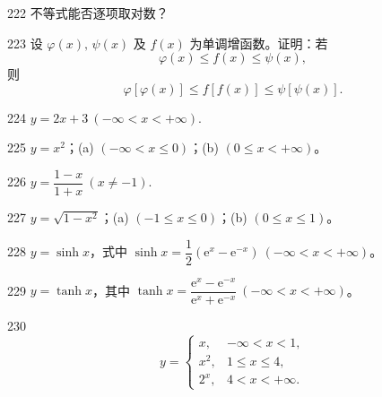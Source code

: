 \begin{prob}[S]{222}
不等式能否逐项取对数？
\end{prob}

\begin{prob}[M]{223}
设 $\varphi(x),\, \psi(x)$ 及 $f(x)$ 为单调增函数。证明：若
\[
\varphi(x) \leqslant f(x) \leqslant \psi(x),
\]
则
\[
\varphi[\varphi(x)] \leqslant f[f(x)] \leqslant \psi[\psi(x)].
\]
\end{prob}


\begin{prob}[S]{224}
$y = 2x + 3\ (-\infty < x < +\infty)$.
\end{prob}

\begin{prob}[M]{225}
$y = x^2$；(a) $(-\infty < x \leqslant 0)$；\qquad (b) $(0 \leqslant x < +\infty)$。
\end{prob}

\begin{prob}[S]{226}
$y = \dfrac{1 - x}{1 + x}\ (x \neq -1)$.
\end{prob}

\begin{prob}[M]{227}
$y = \sqrt{1 - x^2}$；(a) $(-1 \leqslant x \leqslant 0)$；\qquad (b) $(0 \leqslant x \leqslant 1)$。
\end{prob}

\begin{prob}[M]{228}
$y = \sinh x$，式中 $\sinh x = \dfrac{1}{2}(\mathrm{e}^x - \mathrm{e}^{-x})\ (-\infty < x < +\infty)$。
\end{prob}

\begin{prob}[M]{229}
$y = \tanh x$，其中 $\tanh x = \dfrac{\mathrm{e}^x - \mathrm{e}^{-x}}{\mathrm{e}^x + \mathrm{e}^{-x}}\ (-\infty < x < +\infty)$。
\end{prob}

\begin{prob}[M]{230}
\[
y = \begin{cases}
x, & -\infty < x < 1, \\
x^2, & 1 \leqslant x \leqslant 4, \\
2^x, & 4 < x < +\infty.
\end{cases}
\]
\end{prob}

